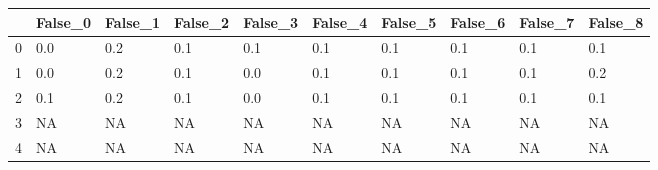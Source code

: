 \begin{tabular}{llllllllll}
\toprule
{} & False\_0 & False\_1 & False\_2 & False\_3 & False\_4 & False\_5 & False\_6 & False\_7 & False\_8 \\ \hline
\midrule
0 &     0.0 &     0.2 &     0.1 &     0.1 &     0.1 &     0.1 &     0.1 &     0.1 &     0.1 \\ \hline
1 &     0.0 &     0.2 &     0.1 &     0.0 &     0.1 &     0.1 &     0.1 &     0.1 &     0.2 \\ \hline
2 &     0.1 &     0.2 &     0.1 &     0.0 &     0.1 &     0.1 &     0.1 &     0.1 &     0.1 \\ \hline
3 &      NA &      NA &      NA &      NA &      NA &      NA &      NA &      NA &      NA \\ \hline
4 &      NA &      NA &      NA &      NA &      NA &      NA &      NA &      NA &      NA \\ \hline
\bottomrule
\end{tabular}
